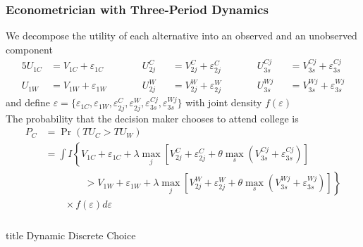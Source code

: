 \documentclass{beamer}
\begin{document}
\begin{frame}\frametitle{Econometrician with Three-Period Dynamics}
    We decompose the utility of each alternative into an observed and an unobserved component
    \begin{alignat*}{5}
        U_{1C} &= V_{1C} + \varepsilon_{1C} \qquad && U_{2j}^C &&= V_{2j}^C + \varepsilon_{2j}^C \qquad && U_{3s}^{Cj} &&= V_{3s}^{Cj} + \varepsilon_{3s}^{Cj} \\
        U_{1W} &= V_{1W} + \varepsilon_{1W} \qquad && U_{2j}^W &&= V_{2j}^W + \varepsilon_{2j}^W \qquad && U_{3s}^{Wj} &&= V_{3s}^{Wj} + \varepsilon_{3s}^{Wj} 
    \end{alignat*}
    and define $\varepsilon = \{\varepsilon_{1C},\varepsilon_{1W}, \varepsilon_{2j}^C, \varepsilon_{2j}^W, \varepsilon_{3s}^{Cj}, \varepsilon_{3s}^{Wj}\}$ with joint density $f(\varepsilon)$ \\
    \vspace{3ex}
    The probability that the decision maker chooses to attend college is
    \begin{align*}
        P_C &= \Pr(TU_C > TU_W) \\
        &= \int I \left\{ V_{1C} + \varepsilon_{1C} + \lambda \max_j \left[ V_{2j}^C + \varepsilon_{2j}^C + \theta \max_s (V_{3s}^{Cj} + \varepsilon_{3s}^{Cj}) \right] \right. \\
        & \left. \qquad \qquad > V_{1W} + \varepsilon_{1W} + \lambda \max_j \left[ V_{2j}^W + \varepsilon_{2j}^W + \theta \max_s (V_{3s}^{Wj} + \varepsilon_{3s}^{Wj}) \right] \right\} \\
        & \qquad \times f(\varepsilon) d \varepsilon
    \end{align*}
\end{frame}

\begin{frame}\frametitle{}
    \vfill
    \centering
    \begin{beamercolorbox}[center]{title}
        \Large Dynamic Discrete Choice
    \end{beamercolorbox}
    \vfill
\end{frame}
\end{document}
